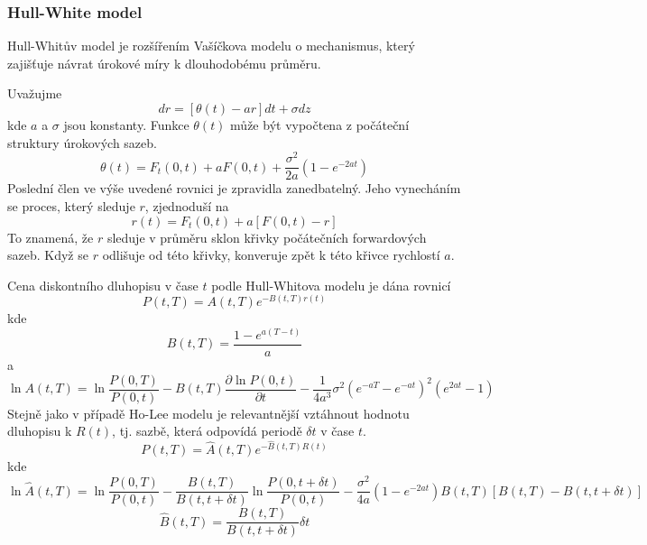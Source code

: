 \documentclass[a4paper]{book}
\begin{document}
\subsubsection{Hull-White model}

Hull-Whitův model je rozšířením Vašíčkova modelu o mechanismus, který zajišťuje návrat úrokové míry k dlouhodobému průměru.

Uvažujme
\begin{equation*}
dr = [\theta(t) - ar]dt+\sigma dz
\end{equation*}
kde $a$ a $\sigma$ jsou konstanty. Funkce $\theta(t)$ může být vypočtena z počáteční struktury úrokových sazeb.
\begin{equation}
\theta(t) = F_t(0,t) + aF(0,t) + \frac{\sigma^2}{2a}(1-e^{-2at})
\end{equation}
Poslední člen ve výše uvedené rovnici je zpravidla zanedbatelný. Jeho vynecháním se proces, který sleduje $r$, zjednoduší na
\begin{equation*}
r(t) = F_t(0,t) + a[F(0,t)-r]
\end{equation*}
To znamená, že $r$ sleduje v průměru sklon křivky počátečních forwardových sazeb. Když se $r$ odlišuje od této křivky, konveruje zpět k této křivce rychlostí $a$.

Cena diskontního dluhopisu v čase $t$ podle Hull-Whitova modelu je dána rovnicí
\begin{equation*}
P(t,T)=A(t,T)e^{-B(t,T)r(t)}
\end{equation*}
kde
\begin{equation*}
B(t,T) = \frac{1-e^{a(T-t)}}{a}
\end{equation*}
a
\begin{equation*}
\ln A(t,T) = \ln \frac{P(0,T)}{P(0,t)}-B(t,T)\frac{\partial \ln P(0,t)}{\partial t}-\frac{1}{4a^3}\sigma^2(e^{-aT}-e^{-at})^2(e^{2at}-1)
\end{equation*}
Stejně jako v případě Ho-Lee modelu je relevantnější vztáhnout hodnotu dluhopisu k $R(t)$, tj. sazbě, která odpovídá periodě $\delta t$ v čase $t$.
\begin{equation*}
P(t,T) = \hat{A}(t,T)e^{-\hat{B}(t,T)R(t)}
\end{equation*}
kde
\begin{equation*}
\ln \hat{A}(t,T) = \ln \frac{P(0,T)}{P(0,t)}-\frac{B(t,T)}{B(t,t+\delta t)}\ln \frac{P(0,t+\delta t)}{P(0,t)}-\frac{\sigma^2}{4a}(1-e^{-2at})B(t,T)[B(t,T)-B(t,t + \delta t)]
\end{equation*}
\begin{equation*}
\hat{B}(t,T)=\frac{B(t,T)}{B(t,t+\delta t)}\delta t
\end{equation*}
\end{document}
